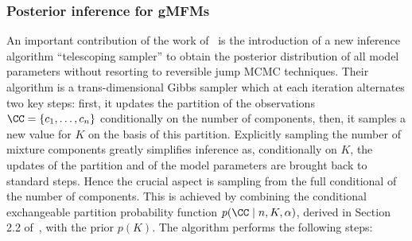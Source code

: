 \subsubsection*{Posterior inference for gMFMs}
An important contribution of the work of~\citet{fruhwirthschnatter2020} is the introduction of a new inference algorithm ``telescoping sampler'' to obtain the posterior distribution of all model parameters without resorting to reversible jump MCMC techniques. Their algorithm is a trans-dimensional Gibbs sampler which at each iteration alternates two key steps: first, it updates the partition of the observations $\CC= \{c_1,\dots,c_n\}$ conditionally on the number of components, then, it samples a new value for $K$ on the basis of this partition.
Explicitly sampling the number of mixture components greatly simplifies inference as, conditionally on $K$, the updates of the partition and of the model parameters are brought back to standard steps.
%
Hence the crucial aspect is sampling from the full conditional of the number of components. This is achieved by combining the conditional exchangeable partition probability function $p(\CC \mid n, K, \alpha)$, derived in Section 2.2 of~\citet{fruhwirthschnatter2020}, with the prior $p(K)$.
%
The algorithm performs the following steps:
